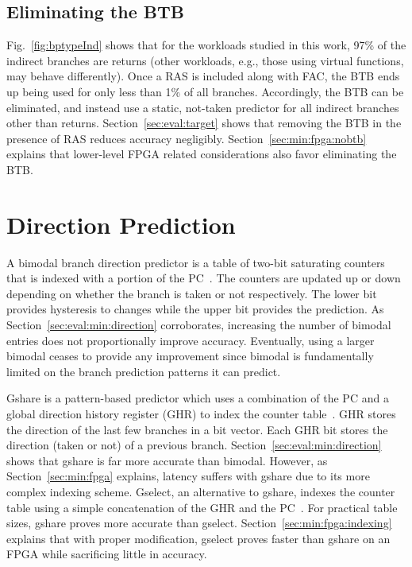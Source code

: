 \subsection{Eliminating the BTB}
\label{sec:min:target:nobtb}
Fig.~\ref{fig:bptypeInd} shows that for the workloads studied in this work, 97\% of the indirect branches are returns (other workloads, e.g., those using virtual functions, may behave differently). Once a RAS is included along with FAC, the BTB ends up being used for only less than 1\% of all branches. Accordingly, the BTB can be eliminated, and instead use a static, not-taken predictor for all indirect branches other than returns. Section~\ref{sec:eval:target} shows that removing the BTB in the presence of RAS reduces accuracy negligibly. Section~\ref{sec:min:fpga:nobtb} explains that lower-level FPGA related considerations also favor eliminating the BTB.

\section{Direction Prediction}
\label{sec:min:direction}
A bimodal branch direction predictor is a table of two-bit saturating counters that is indexed with a portion of the PC~\cite{bimodal}. The counters are updated up or down depending on whether the branch is taken or not respectively. The lower bit provides hysteresis to changes while the upper bit provides the prediction. As Section~\ref{sec:eval:min:direction} corroborates, increasing the number of bimodal entries does not proportionally improve accuracy. Eventually, using a larger bimodal ceases to provide any improvement since bimodal is fundamentally limited on the branch prediction patterns it can predict.

Gshare is a pattern-based predictor which uses a combination of the PC and a global direction history register (GHR) to index the counter table~\cite{McFarling}. GHR stores the direction of the last few branches in a bit vector. Each GHR bit stores the direction (taken or not) of a previous branch.  Section~\ref{sec:eval:min:direction} shows that gshare is far more accurate than bimodal. However, as Section~\ref{sec:min:fpga} explains, latency suffers with gshare due to its more complex indexing scheme. Gselect, an alternative to gshare, indexes the counter table using a simple concatenation of the GHR and the PC~\cite{McFarling}. For practical table sizes, gshare proves more accurate than gselect. Section~\ref{sec:min:fpga:indexing} explains that with proper modification, gselect proves faster than gshare on an FPGA while sacrificing little in accuracy.


